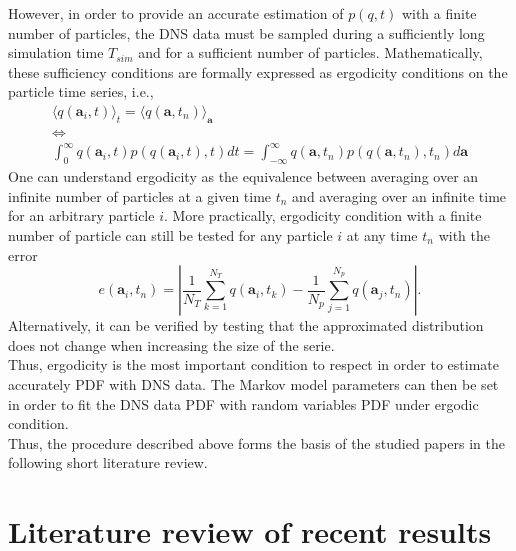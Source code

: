 However, in order to provide an accurate estimation of $p(q,t)$ with a finite number of particles, the DNS data 
must be sampled during a sufficiently long simulation time $T_{sim}$ and for a sufficient number of particles. 
Mathematically, these sufficiency conditions are formally expressed as ergodicity conditions on the particle time series, i.e.,
\begin{equation}
\begin{array}{c}
	\langle q(\textbf{a}_i,t)\rangle_t = \langle q(\textbf{a},t_n)\rangle_{\textbf{a}}\\
	\Leftrightarrow\\
	\int_{0}^{\infty}q(\textbf{a}_i,t) p(q(\textbf{a}_i,t),t)dt=\int_{-\infty}^{\infty}q(\textbf{a},t_n)p(q(\textbf{a},t_n),t_n)d\textbf{a}
\end{array}
\label{eq:ergodicity}
\end{equation}
One can understand ergodicity as the equivalence between averaging over an infinite number of particles at a given time $t_n$ and averaging over an infinite time for an arbitrary particle $i$. 
More practically, ergodicity condition with a finite number of particle can still be tested for any particle $i$ at any time $t_n$ with the error
\begin{equation}\label{eq:ergo_err}
	e(\textbf{a}_i,t_n)=|\frac{1}{N_T}\sum_{k=1}^{N_T}q(\textbf{a}_i,t_k)-\frac{1}{N_p}\sum_{j=1}^{N_p}q(\textbf{a}_j,t_n)|.
\end{equation}
Alternatively, it can be verified by testing that the approximated distribution does not change when increasing the size of the serie.\\
Thus, ergodicity is the most important condition to respect in order to estimate accurately PDF with DNS data. 
The Markov model parameters can then be set in order to fit the DNS data PDF with random variables PDF under ergodic condition.\\
Thus, the procedure described above forms the basis of the studied papers in the following short literature review.
\section{Literature review of recent results}
